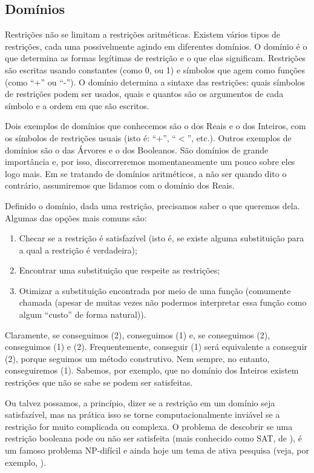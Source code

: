 \documentclass{article}
\begin{document}
\subsection{Domínios}

Restrições não se limitam a restrições aritméticas. Existem vários
tipos de restrições, cada uma possivelmente agindo em diferentes
domínios.  O domínio é o que determina as formas legítimas de
restrição e o que elas significam. Restrições são escritas usando
constantes (como 0, ou 1) e símbolos que agem como funções (como ``+''
ou ``-''). O domínio determina a sintaxe das restrições: quais
símbolos de restrições podem ser usados, quais e quantos são os
argumentos de cada símbolo e a ordem em que são escritos.

Dois exemplos de domínios que conhecemos são o dos Reais e o dos
Inteiros, com os símbolos de restrições usuais (isto é: ``+'',
``$<$'', etc.). Outros exemplos de domínios são o das Árvores e o dos
Booleanos. São domínios de grande importância e, por isso,
discorreremos momentaneamente um pouco sobre eles logo mais. Em se
tratando de domínios aritméticos, a não ser quando dito o contrário,
assumiremos que lidamos com o domínio dos Reais.

Definido o domínio, dada uma restrição, precisamos saber o que
queremos dela. Algumas das opções mais comuns são:
\begin{enumerate}
\item Checar se a restrição é satisfazível (isto é, se existe
  alguma substituição para a qual a restrição é verdadeira);
\item Encontrar uma substituição que respeite as restrições;
\item Otimizar a substituição encontrada por meio de uma função
  (comumente chamada  (apesar de muitas
  vezes não podermos interpretar essa função como algum ``custo''
  de forma natural)).
\end{enumerate}

Claramente, se conseguimos (2), conseguimos (1) e, se conseguimos
(2), conseguimos (1) e (2). Frequentemente, conseguir (1) será
equivalente a conseguir (2), porque seguimos um método
construtivo. Nem sempre, no entanto, conseguiremos (1). Sabemos, por
exemplo, que no domínio dos Inteiros existem restrições que não se
sabe se podem ser satisfeitas.

Ou talvez possamos, a princípio, dizer se a restrição em um domínio
seja satisfazível, mas na prática isso se torne computacionalmente
inviável se a restrição for muito complicada ou complexa. O problema
de descobrir se uma restrição booleana pode ou não ser satisfeita
(mais conhecido como SAT, de ), é um famoso problema NP-difícil e ainda hoje um tema de
ativa pesquisa (veja, por exemplo, \cite{sat}).
\end{document}
